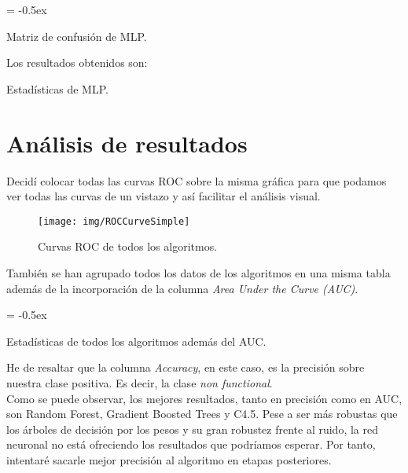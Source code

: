 \documentclass[paper=a4, fontsize=12pt]{article} %
\numberwithin{equation}{section} %
\numberwithin{figure}{section} %
\numberwithin{table}{section} %
\begin{document}
	\extrarowheight = -0.5ex %
	\renewcommand{\arraystretch}{1.75} %
	\begin{table}[H]
		\begin{center}
		\end{center}
		\caption {Matriz de confusión de MLP.}
		\label {mcNNs}
	\end{table}

	Los resultados obtenidos son:
	\begin{table}[H]
		\begin{center}
		\end{center}
		\caption {Estadísticas de MLP.}
		\label {statisticsNNs}
	\end{table}
\newpage

\section{Análisis de resultados}
Decidí colocar todas las curvas ROC sobre la misma gráfica para que podamos ver todas las curvas de un vistazo y así facilitar el análisis visual.

	\begin{figure}[H]
	  \centering
	  \texttt{[image: img/ROCCurveSimple]}
	  \caption{Curvas ROC de todos los algoritmos.}
	  \label{curva_roc_simple}
	\end{figure}

También se han agrupado todos los datos de los algoritmos en una misma tabla además de la incorporación de la columna \textit{Area Under the Curve (AUC)}.

	\extrarowheight = -0.5ex %
	\renewcommand{\arraystretch}{1.75} %
	\begin{table}[H]
		\begin{center}
		\end{center}
		\caption {Estadísticas de todos los algoritmos además del AUC.}
		\label {statistics}
	\end{table}

He de resaltar que la columna \textit{Accuracy}, en este caso, es la precisión sobre nuestra clase positiva. Es decir, la clase \textit{non functional}. \\

Como se puede observar, los mejores resultados, tanto en precisión como en AUC, son Random Forest, Gradient Boosted Trees y C4.5.
Pese a ser más robustas que los árboles de decisión por los pesos y su gran robustez frente al ruido, la red neuronal no está ofreciendo los resultados que podríamos esperar. Por tanto, intentaré sacarle mejor precisión al algoritmo en etapas posteriores. \\
\end{document}
